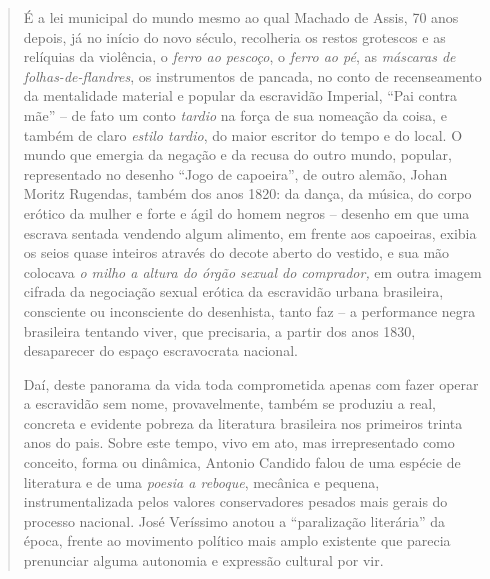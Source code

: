 \begin{quote}
É a lei municipal do mundo mesmo ao qual Machado de Assis, 70 anos
depois, já no início do novo século, recolheria os restos grotescos e as
relíquias da violência, o \emph{ferro ao pescoço}, o \emph{ferro ao pé},
as \emph{máscaras de folhas-de-flandres}, os instrumentos de pancada, no
conto de recenseamento da mentalidade material e popular da escravidão
Imperial, ``Pai contra mãe'' -- de fato um conto \emph{tardio} na força
de sua nomeação da coisa, e também de claro \emph{estilo tardio}, do
maior escritor do tempo e do local. O mundo que emergia da negação e da
recusa do outro mundo, popular, representado no desenho ``Jogo de
capoeira'', de outro alemão, Johan Moritz Rugendas, também dos anos
1820: da dança, da música, do corpo erótico da mulher e forte e ágil do
homem negros -- desenho em que uma escrava sentada vendendo algum
alimento, em frente aos capoeiras, exibia os seios quase inteiros
através do decote aberto do vestido, e sua mão colocava \emph{o milho a
altura do órgão sexual do comprador,} em outra imagem cifrada da
negociação sexual erótica da escravidão urbana brasileira, consciente ou
inconsciente do desenhista, tanto faz -- a performance negra brasileira
tentando viver, que precisaria, a partir dos anos 1830, desaparecer do
espaço escravocrata nacional.

Daí, deste panorama da vida toda comprometida apenas com fazer operar a
escravidão sem nome, provavelmente, também se produziu a real, concreta
e evidente pobreza da literatura brasileira nos primeiros trinta anos do
pais. Sobre este tempo, vivo em ato, mas irrepresentado como conceito,
forma ou dinâmica, Antonio Candido falou de uma espécie de literatura e
de uma \emph{poesia a reboque}, mecânica e pequena, instrumentalizada
pelos valores conservadores pesados mais gerais do processo nacional.
José Veríssimo anotou a ``paralização literária'' da época, frente ao
movimento político mais amplo existente que parecia prenunciar alguma
autonomia e expressão cultural por vir.


\end{quote}
